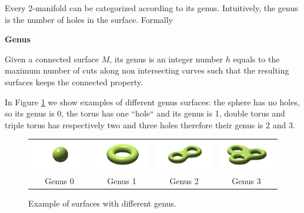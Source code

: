 Every 2-manifold can be categorized according to its genus. Intuitively, the genus is the number of holes in the surface. Formally


 
\begin{mydef}
\textbf{Genus}

Given a connected surface $M$, its genus is an integer number $h$ equals to the maximum number of cuts along non intersecting curves such that the resulting surfaces keeps the connected property.
\end{mydef}

In Figure \ref{fig:torus} we show examples of different genus surfaces: the sphere has no holes, so its genus is 0, the torus has one ``hole`` and its genus is 1, double torus and triple torus has respectively two and three holes therefore their genus is 2 and 3.
\begin{figure}

 \begin{tabular}{cccc}
  \includegraphics[width=0.22\columnwidth]{./img/sphere}&
  \includegraphics[width=0.22\columnwidth]{./img/torus}&
  \includegraphics[width=0.22\columnwidth]{./img/doubleTorus}&
  \includegraphics[width=0.22\columnwidth]{./img/tripletorus}\\
  Genus 0 & Genus 1 & Genus 2 & Genus 3
 \end{tabular}
 \caption{Example of surfaces with different genus.}
 \label{fig:torus}
\end{figure}




